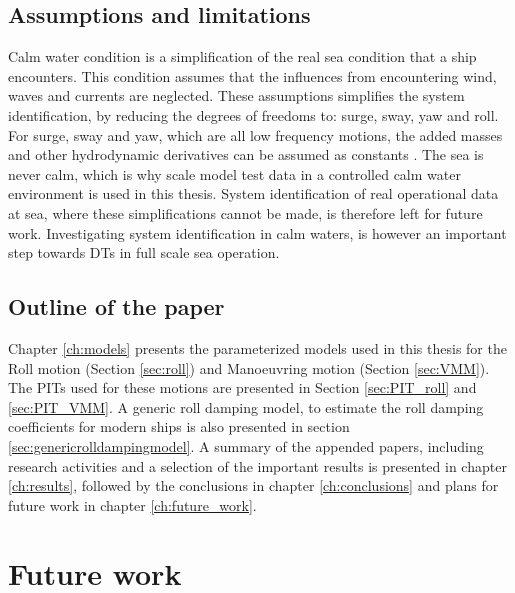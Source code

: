 \section{Assumptions and limitations}
Calm water condition is a simplification of the real sea condition that a ship encounters. This condition assumes that the influences from encountering wind, waves and currents are neglected. These assumptions simplifies the system identification, by reducing the degrees of freedoms to: surge, sway, yaw and roll. For surge, sway and yaw, which are all low frequency motions, the added masses and other hydrodynamic derivatives can be assumed as constants \cite{fossen_handbook_2021}.  
The sea is never calm, which is why scale model test data in a controlled calm water environment is used in this thesis. System identification of real operational data at sea, where these simplifications cannot be made, is  therefore left for future work. Investigating system identification in calm waters, is however an important step towards DTs in full scale sea operation.

\section{Outline of the paper}
Chapter \ref{ch:models} presents the parameterized models used in this thesis for the Roll motion (Section \ref{sec:roll}) and Manoeuvring motion (Section \ref{sec:VMM}). The PITs used for these motions are presented in Section \ref{sec:PIT_roll} and \ref{sec:PIT_VMM}. A generic roll damping model, to estimate the roll damping coefficients for modern ships is also presented in section \ref{sec:genericrolldampingmodel}.
A summary of the appended papers, including research activities and a selection of the important results is presented in chapter \ref{ch:results}, followed by the conclusions in chapter \ref{ch:conclusions} and plans for future work in chapter \ref{ch:future_work}.






\chapter{Future work\label{ch:future_work}}
